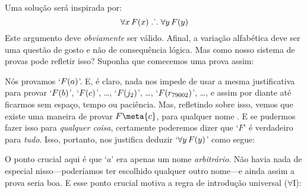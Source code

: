 Uma solu\c c\~ao ser\'a inspirada por:
$$\forall x\,\mathord{F}(x) \mathrel{\ldotp\dot{}\,\ldotp} \forall y\,\mathord{F}(y)$$
Este argumento deve \emph{obviamente} ser v\'alido. Afinal, a varia\c c\~ao alfab\'etica deve ser uma quest\~ao de gosto e  n\~ao de consequ\^encia l\'ogica. Mas como nosso sistema de provas  pode refletir isso? Suponha que comecemos uma prova assim:
\begin{fitchproof}
	 
\end{fitchproof}
  N\'os provamos `$\mathord{F}(a)$'. E, \'e claro, nada nos impede de usar a mesma justificativa para provar `$\mathord{F}(b)$', `$\mathord{F}(c)$', \ldots, `$\mathord{F}(j_2)$', \ldots, `$\mathord{F}(r_{79002})$', \dots, e assim por diante at\'e ficarmos sem espa\c co, tempo ou paci\^encia. Mas, refletindo sobre isso, vemos que existe uma maneira de provar $F\meta{c}$, para qualquer nome . E se pudermos fazer isso para   \emph{qualquer coisa}, certamente poderemos dizer que  `$F$' \'e verdadeiro para \emph{tudo}. Isso, portanto, nos justifica deduzir `$\forall y\,\mathord{F}(y)$' como segue:
\begin{fitchproof}
	 
	 
\end{fitchproof}
O ponto crucial aqui \'e que `$a$' era apenas um nome \emph{arbitr\'ario}. N\~ao havia nada de especial nisso---poder\'iamos ter escolhido qualquer outro nome---e ainda assim a prova seria boa. E esse ponto crucial motiva a regra de introdu\c c\~ao  universal ($\forall$I):

